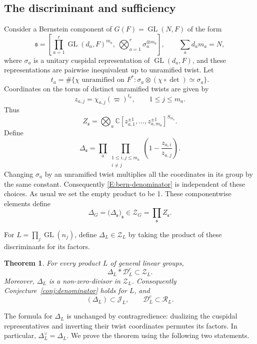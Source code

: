 \documentclass[11pt,a4paper]{amsart}
\newcommand{\mcD}{\mathcal D}
\newcommand{\mcZ}{\mathcal Z}
\newcommand{\mcR}{\mathcal R}
\newcommand{\mcJ}{\mathcal J}
\newtheorem{theorem}{Theorem}[section]
\theoremstyle{definition}
\theoremstyle{remark}
\DeclareMathOperator{\GL}{GL}
\newcommand{\grs}{\mathfrak s}
\begin{document}
\subsection{The discriminant and sufficiency}\label{SS:bern-statement}

Consider a Bernstein component of $G(F)=\GL(N,F)$
of the form
\begin{equation}\label{E:bern-component}
 \grs=
 \left[
 \prod_{a=1}^{r}\GL(d_a,F)^{m_a},
 \ \bigotimes_{a=1}^{r}\sigma_a^{\otimes m_a}
 \right],
 \qquad \sum_a d_am_a=N,
\end{equation}
where $\sigma_a$ is a unitary cuspidal representation of $\GL(d_a,F)$,
and these representations are pairwise
inequivalent up to unramified twist. Let
$$
 t_a=\#\{\chi\text{ unramified on }F^*:
          \sigma_a\otimes(\chi\circ\det)\simeq\sigma_a\}.
$$
Coordinates on the torus of distinct unramified twists are given by
$$
 z_{a,j}=\chi_{a,j}(\varpi)^{t_a},
 \qquad 1\leq j\leq m_a.
$$
Thus
$$
 Z_{\grs}
 =\bigotimes_a
 \mathbb C[z_{a,1}^{\pm1},\ldots,z_{a,m_a}^{\pm1}]^{S_{m_a}}.
$$
Define
\begin{equation}\label{E:bern-denominator}
 \Delta_{\grs}
 =\prod_a\prod_{\substack{1\leq i,j\leq m_a\\i\ne j}}
       \left(1-\frac{z_{a,i}}{z_{a,j}}\right).
\end{equation}
Changing $\sigma_a$ by an unramified twist multiplies all the coordinates
in its group by the same constant. Consequently
\eqref{E:bern-denominator} is independent of these choices. As usual we set the empty product to be 1.
These componentwise elements define
$$
 \Delta_{G}
 =\bigl(\Delta_{\grs}\bigr)_{\grs}
 \in\mcZ_G
 =\prod_{\grs} Z_{\grs}.
$$

For $L=\prod_j\GL(n_j)$, define
$\Delta_L\in\mcZ_L$ by taking the product of these discriminants
for its factors.


\begin{theorem}\label{T:denominator-main}
For every product $L$ of general linear groups,
$$
 \Delta_L*\mcD_L^c\subset\mcZ_L.
$$
Moreover, $\Delta_L$ is a non-zero-divisor in $\mcZ_L$.
Consequently Conjecture~\ref{conj:denominator} holds for $L$, and
$$
 (\Delta_L)\subset\mcJ_L,\qquad \mcD_L^c\subset\mcR_L.
$$
\end{theorem}

The formula for $\Delta_L$ is unchanged by contragredience: dualizing
the cuspidal representatives and inverting their twist coordinates
permutes its factors. In particular, $\Delta_L^\vee=\Delta_L$.
We prove the theorem using the following two statements.
\end{document}

